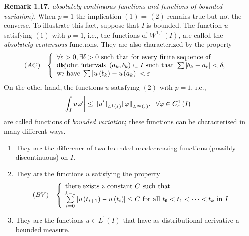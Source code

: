 \documentclass[a4paper,oneside]{article}
\numberwithin{equation}{section}
\begin{document}
\textbf{Remark 1.17.} \textit{absolutely continuous functions and functions of bounded variation).} When $p=1$ the implication $\left( 1 \right) \Rightarrow \left( 2 \right)$ remains true but not the converse. To illustrate this fact, suppose that $I$ is bounded. The function $u$ satisfying $\left(1\right)$ with $p=1$, i.e., the functions of $W^{1,1}\left(I\right)$, are called the \textit{absolutely continuous} functions. They are also characterized by the property
\begin{align}
\left(AC\right) \hspace{0.3cm}\left\{ \begin{array}{l}
\forall \varepsilon  > 0,\exists \delta  > 0\mbox{ such that for every finite sequence of}\\
\mbox{disjoint intervals }\left( {{a_k},{b_k}} \right) \subset I\mbox{ such that } \sum {\left| {{b_k} - {a_k}} \right|}  < \delta ,\\
\mbox{we have }\sum {\left| {u\left( {{b_k}} \right) - u\left( {{a_k}} \right)} \right|}  < \varepsilon 
\end{array} \right.
\end{align}
On the other hand, the functions $u$ satisfying $\left(2\right)$ with $p=1$, i.e.,
\begin{align}
\left| {\int_I {u\varphi '} } \right| \le {\left\| {u'} \right\|_{{L^1}\left( I \right)}}{\left\| \varphi  \right\|_{{L^\infty }\left( I \right)}},\hspace{0.2cm}\forall \varphi  \in C_c^1\left( I \right)
\end{align}
are called functions of \textit{bounded variation}; these functions can be characterized in many different ways.
\begin{enumerate}
\item They are the difference of two bounded nondecreasing functions (possibly discontinuous) on $I$.
\item They are the functions $u$ satisfying the property
\begin{align}
\left( {BV} \right)\hspace{0.3cm} \left\{ \begin{array}{l}
\mbox{there exists a constant }C\mbox{ such that}\\
\sum\limits_{i = 0}^{k - 1} {\left| {u\left( {{t_{i + 1}}} \right) - u\left( {{t_i}} \right)} \right|}  \le C\mbox{ for all } {t_0} < {t_1} <  \cdots  < {t_k}\mbox{ in } I
\end{array} \right.
\end{align}
\item They are the functions $u\in L^1\left(I\right)$ that have as distributional derivative a bounded measure.
\end{enumerate}
\end{document}
